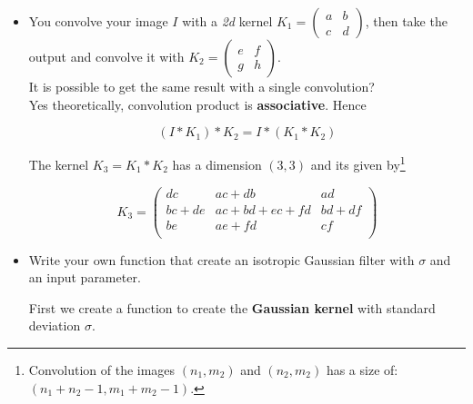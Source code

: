 \documentclass[a4paper]{tufte-handout}
\begin{document}
\begin{itemize}
\item You convolve your image $I$ with a \emph{2d} kernel
  $K_1 =\begin{pmatrix} a & b\\c & d\end{pmatrix}$, then take the output and convolve
  it with $K_2 = \begin{pmatrix}e & f \\ g & h\end{pmatrix}$.\\[4pt]

  It is possible to get the same result with a single convolution?\\

Yes theoretically, convolution product is \textbf{associative}. Hence 

\begin{equation}
  (I * K_1) * K_2 = I * (K_1*K_2)
\end{equation}
  

The kernel $K_3 =K_1 * K_2$ has a dimension $(3,3)$ and its given
by\footnote{Convolution of the images $(n_1,m_2)$ and $(n_2,m_2)$ has a size
  of:\\

$(n_1 + n_2 - 1, m_1 + m_2 -1)$.}

\begin{equation}
  K_3 = \begin{pmatrix}
    dc & ac + db & ad \\
    bc + de & ac + bd + ec + fd & bd + df\\
    be & ae + fd & cf\\
  \end{pmatrix}
\end{equation}
\end{itemize}
\begin{itemize}
\item Write your own function that create an isotropic Gaussian filter with
  $\sigma$ and an input parameter.

First we create a function to create the \textbf{Gaussian kernel} with standard
deviation $\sigma$.
\end{itemize}
\end{document}
